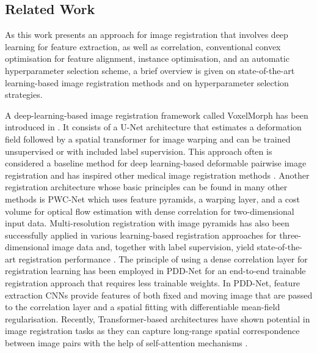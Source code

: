 \subsection{Related Work}
As this work presents an approach for image registration that involves deep learning for feature extraction, as well as correlation, conventional convex optimisation for feature alignment, instance optimisation, and an automatic hyperparameter selection scheme, a brief overview is given on state-of-the-art learning-based image registration methods and on hyperparameter selection strategies. 

A deep-learning-based image registration framework called VoxelMorph has been introduced in \citep{balakrishnan2019voxelmorph}. It consists of a U-Net architecture that estimates a deformation field followed by a spatial transformer for image warping and can be trained unsupervised or with included label supervision. This approach often is considered a baseline method for deep learning-based deformable pairwise image registration and has inspired other medical image registration methods \citep{li2022dual,zhu2022swin, jia2021learning, mok2020fast,zhao2019recursive}. Another registration architecture whose basic principles can be found in many other methods is PWC-Net \citep{sun2018pwc} which uses feature pyramids, a warping layer, and a cost volume for optical flow estimation with dense correlation for two-dimensional input data. Multi-resolution registration with image pyramids has also been successfully applied in various learning-based registration approaches for three-dimensional image data \citep{hering2019mlvirnet,gunnarsson2020learning,mok2020large,mok2021conditional} and, together with label supervision, yield state-of-the-art registration performance \citep{mok2020large}. The principle of using a dense correlation layer for registration learning has been employed in PDD-Net \citep{heinrich2019closing} for an end-to-end trainable registration approach that requires less trainable weights. In PDD-Net, feature extraction CNNs provide features of both fixed and moving image that are passed to the correlation layer and a spatial fitting with differentiable mean-field regularisation. Recently, Transformer-based architectures have shown potential in image registration tasks as they can capture long-range spatial correspondence between image pairs with the help of self-attention mechanisms \citep{chen2022transmorph,mok2022affine}.

